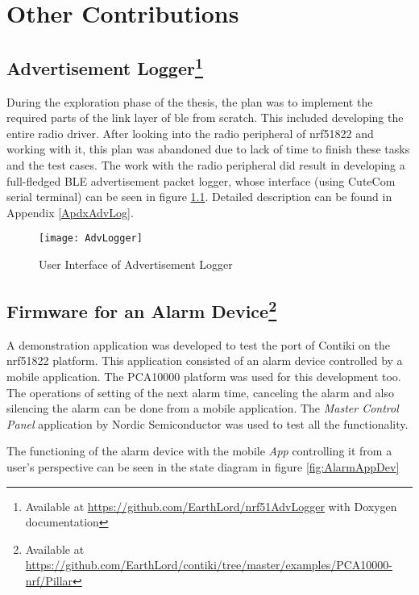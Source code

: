 \chapter{Other Contributions} \label{8OtherContri}

\section[Advertisement Logger]{Advertisement Logger\footnote{Available at \url{https://github.com/EarthLord/nrf51AdvLogger} with Doxygen documentation}} \label{8AdvLogger}

During the exploration phase of the thesis, the plan was to implement the required parts of the link layer of \gls{ble} from scratch. This included developing the entire radio driver. After looking into the radio peripheral of nrf51822 and working with it, this plan was abandoned due to lack of time to finish these tasks and the test cases. The work with the radio peripheral did result in developing a full-fledged BLE advertisement packet logger, whose interface (using CuteCom serial terminal) can be seen in figure \ref{fig:UIAdvLogger}. Detailed description can be found in Appendix \ref{ApdxAdvLog}. 

\begin{figure}[h]
\centering
\texttt{[image: AdvLogger]}
\caption{User Interface of Advertisement Logger}
\label{fig:UIAdvLogger}
\vspace{-5pt}
\end{figure}

\section[Firmware for an Alarm Device]{Firmware for an Alarm Device\footnote{Available at \url{https://github.com/EarthLord/contiki/tree/master/examples/PCA10000-nrf/Pillar}}}

A demonstration application was developed to test the port of Contiki on the nrf51822 platform. This application consisted of an alarm device controlled by a mobile application. The PCA10000 platform was used for this development too. The operations of setting of the next alarm time, canceling the alarm and also silencing the alarm can be done from a mobile application. The \emph{Master Control Panel} application by Nordic Semiconductor was used to test all the functionality.

The functioning of the alarm device with the mobile \emph{App} controlling it from a user's perspective can be seen in the state diagram in figure \ref{fig:AlarmAppDev}

